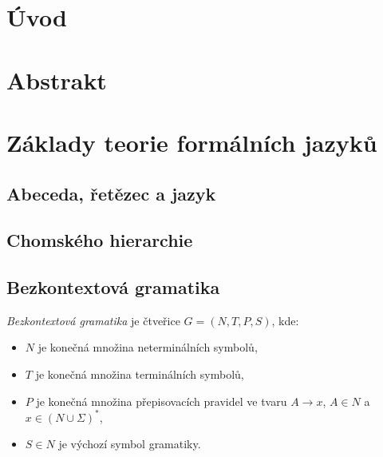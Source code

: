 
%

\chapter{Úvod}\label{1_uvod}


\chapter{Abstrakt}\label{2_abstrakt}


\chapter{Základy teorie formálních jazyků}\label{3_teorie}

\section{Abeceda, řetězec a jazyk}
\section{Chomského hierarchie}
\section{Bezkontextová gramatika}

\begin{definition}\label{def_bkg}
    \emph{Bezkontextová gramatika} je čtveřice $G = (N, T, P, S)$, kde:
    \begin{itemize}
        \item $N$ je konečná množina neterminálních symbolů,
        \item $T$ je konečná množina terminálních symbolů,
        \item $P$ je konečná množina přepisovacích pravidel ve tvaru $A \rightarrow x$, $A \in N$ a $x \in (N \cup \Sigma)^*$,
        \item $S \in N$ je výchozí symbol gramatiky.
    \end{itemize}
\end{definition}

